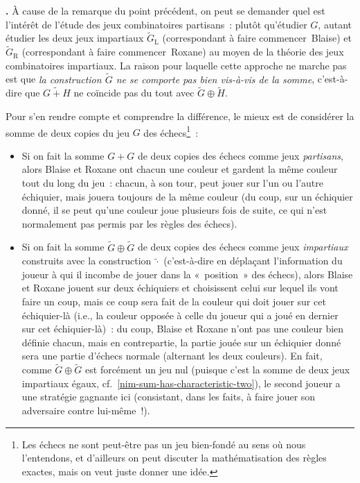 \documentclass[12pt,a4paper]{article}
\theoremstyle{definition}
\newcommand\thingy{%
\refstepcounter{comcnt}\smallskip\noindent\textbf{\thecomcnt.} }
\begin{document}
\thingy À cause de la remarque du point précédent, on peut se demander
quel est l'intérêt de l'étude des jeux combinatoires partisans :
plutôt qu'étudier $G$, autant étudier les deux jeux impartiaux $\tilde
G_{\mathrm{L}}$ (correspondant à faire commencer Blaise) et $\tilde
G_{\mathrm{R}}$ (correspondant à faire commencer Roxane) au moyen de
la théorie des jeux combinatoires impartiaux.  La raison pour laquelle
cette approche ne marche pas est que \emph{la construction $\tilde G$
  ne se comporte pas bien vis-à-vis de la somme}, c'est-à-dire que
$\widetilde{G+H}$ ne coïncide pas du tout avec $\tilde G \oplus \tilde
H$.

Pour s'en rendre compte et comprendre la différence, le mieux est de
considérer la somme de deux copies du jeu $G$ des échecs\footnote{Les
  échecs ne sont peut-être pas un jeu bien-fondé au sens où nous
  l'entendons, et d'ailleurs on peut discuter la mathématisation des
  règles exactes, mais on veut juste donner une idée.} :
\begin{itemize}
\item Si on fait la somme $G + G$ de deux copies des échecs comme jeux
  \emph{partisans}, alors Blaise et Roxane ont chacun une couleur et
  gardent la même couleur tout du long du jeu : chacun, à son tour,
  peut jouer sur l'un ou l'autre échiquier, mais jouera toujours de la
  même couleur (du coup, sur un échiquier donné, il se peut qu'une
  couleur joue plusieurs fois de suite, ce qui n'est normalement pas
  permis par les règles des échecs).
\item Si on fait la somme $\tilde G \oplus \tilde G$ de deux copies
  des échecs comme jeux \emph{impartiaux} construits avec la
  construction $\tilde{{\cdot}}$ (c'est-à-dire en déplaçant
  l'information du joueur à qui il incombe de jouer dans la
  « position » des échecs), alors Blaise et Roxane jouent sur deux
  échiquiers et choisissent celui sur lequel ils vont faire un coup,
  mais ce coup sera fait de la couleur qui doit jouer sur cet
  échiquier-là (i.e., la couleur opposée à celle du joueur qui a joué
  en dernier sur cet échiquier-là) : du coup, Blaise et Roxane n'ont
  pas une couleur bien définie chacun, mais en contrepartie, la partie
  jouée sur un échiquier donné sera une partie d'échecs normale
  (alternant les deux couleurs).  En fait, comme $\tilde G \oplus
  \tilde G$ est forcément un jeu nul (puisque c'est la somme de deux
  jeux impartiaux égaux, cf. \ref{nim-sum-has-characteristic-two}), le
  second joueur a une stratégie gagnante ici (consistant, dans les
  faits, à faire jouer son adversaire contre lui-même !).
\end{itemize}
\end{document}
